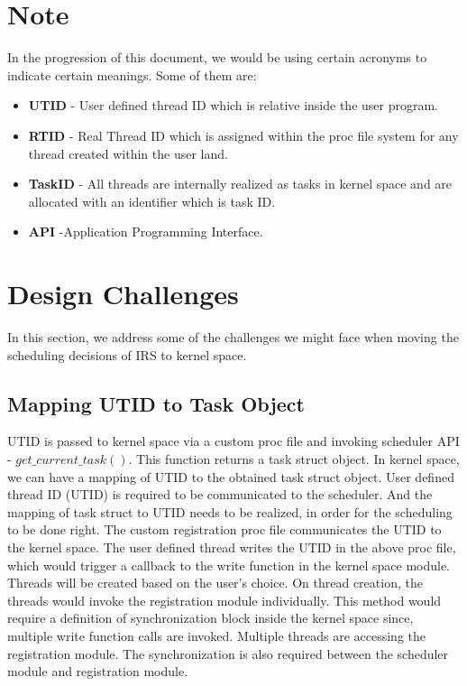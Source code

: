 \section*{Note}
In the progression of this document, we would be using certain acronyms to indicate certain meanings. 
Some of them are:
\begin{itemize}
\item \textbf{UTID} - User defined thread ID which is relative inside the user program. 
\item \textbf{RTID} - Real Thread ID which is assigned within the proc file system for any thread created within the user land. 
\item \textbf{TaskID} - All threads are internally realized as tasks in kernel space and are allocated with an identifier which is task ID.
\item \textbf{API} -Application Programming Interface.
\end{itemize}

\section{Design Challenges}

In this section, we address some of the challenges we might face when moving the scheduling decisions of IRS to kernel space.

\subsection{Mapping UTID to Task Object}

UTID  is passed to kernel space via a custom proc file and invoking scheduler API - $get\_current\_task()$. 
This function returns a task struct object. 
In kernel space, we can have a mapping of UTID to the obtained task struct object. 
User defined thread ID (UTID) is required to be communicated to the scheduler. 
And the mapping of task struct to UTID needs to be realized, in order for the scheduling to be done right. 
The custom registration proc file communicates the UTID to the kernel space. 
The user defined thread writes the UTID in the above proc file, which would trigger a callback to the write function in the kernel space module. 
Threads will be created based on the user's choice. 
On thread creation, the threads would invoke the registration module individually. 
This method would require a definition of synchronization block inside the kernel space since, multiple write function calls are invoked. 
Multiple threads are accessing the registration module. 
The synchronization is also required between the scheduler module and registration module.


